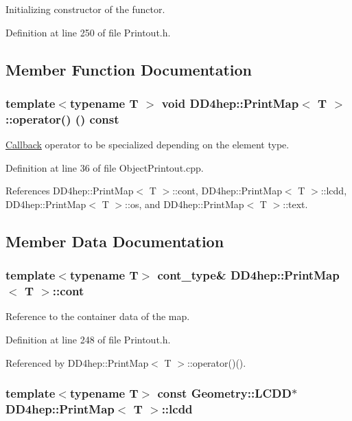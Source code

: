 Initializing constructor of the functor. 

Definition at line 250 of file Printout.h.

\subsection{Member Function Documentation}
\hypertarget{struct_d_d4hep_1_1_print_map_acda45067e3f2c8ad01e89c8bd0cd497e}{
\subsubsection[{operator()}]{\setlength{\rightskip}{0pt plus 5cm}template$<$typename T $>$ void {\bf DD4hep::PrintMap}$<$ {\bf T} $>$::operator() () const}}
\label{struct_d_d4hep_1_1_print_map_acda45067e3f2c8ad01e89c8bd0cd497e}


\hyperlink{class_d_d4hep_1_1_callback}{Callback} operator to be specialized depending on the element type. 

Definition at line 36 of file ObjectPrintout.cpp.

References DD4hep::PrintMap$<$ T $>$::cont, DD4hep::PrintMap$<$ T $>$::lcdd, DD4hep::PrintMap$<$ T $>$::os, and DD4hep::PrintMap$<$ T $>$::text.

\subsection{Member Data Documentation}
\hypertarget{struct_d_d4hep_1_1_print_map_a5129907f452fc99969ce127ee6bb0f31}{
\subsubsection[{cont}]{\setlength{\rightskip}{0pt plus 5cm}template$<$typename T$>$ {\bf cont\_\-type}\& {\bf DD4hep::PrintMap}$<$ {\bf T} $>$::{\bf cont}}}
\label{struct_d_d4hep_1_1_print_map_a5129907f452fc99969ce127ee6bb0f31}


Reference to the container data of the map. 

Definition at line 248 of file Printout.h.

Referenced by DD4hep::PrintMap$<$ T $>$::operator()().\hypertarget{struct_d_d4hep_1_1_print_map_a7d3f9991b68729e077b0682903d5448d}{
\subsubsection[{lcdd}]{\setlength{\rightskip}{0pt plus 5cm}template$<$typename T$>$ const {\bf Geometry::LCDD}$\ast$ {\bf DD4hep::PrintMap}$<$ {\bf T} $>$::{\bf lcdd}}}
\label{struct_d_d4hep_1_1_print_map_a7d3f9991b68729e077b0682903d5448d}


